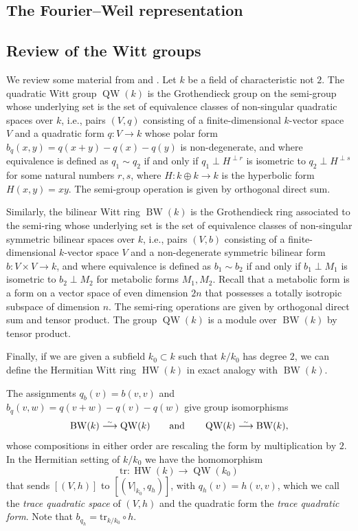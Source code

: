 \documentclass{article}
\def\tx#1{\textrm{#1}}
\def\simto{\buildrel\hbox{\tiny{$\sim$}}\over\longrightarrow}
\theoremstyle{definition}
\numberwithin{equation}{subsection}
\renewcommand{\-}{\hyp{}}
\DeclareMathOperator{\BW}{BW}
\DeclareMathOperator{\HW}{HW}
\DeclareMathOperator{\QW}{QW}
\begin{document}
\begin{appendices}
	 
	\section{The Fourier--Weil representation} \label{app:fw}

\subsection{Review of the Witt groups} \label{sub:Wittgroup}

We review some material from \cite{EKM2008} and \cite[Appendix 2]{MH73}. Let $k$ be a field of characteristic not $2$. The quadratic Witt group $\QW(k)$\index[notation]{QW@$\QW$} is the Grothendieck group on the semi-group whose underlying set is the set of equivalence classes of non-singular quadratic spaces over $k$, i.e., pairs $(V,q)$ consisting of a finite-dimensional $k$-vector space $V$ and a quadratic form $q : V \to k$ whose polar form $b_q(x,y)=q(x+y)-q(x)-q(y)$ is non-degenerate, and where equivalence is defined as $q_1 \sim q_2$ if and only if $q_1 \perp H^{\perp r}$ is isometric to $q_2 \perp H^{\perp s}$ for some natural numbers $r,s$, where $H : k \oplus k \to k$ is the hyperbolic form $H(x,y)=xy$. The semi-group operation is given by orthogonal direct sum.

Similarly, the bilinear Witt
ring $\BW(k)$\index[notation]{BW@$\BW$} is the Grothendieck ring associated to the semi-ring whose underlying set is the set of equivalence classes of non-singular symmetric bilinear spaces over $k$, i.e., pairs $(V,b)$ consisting of a finite-dimensional $k$-vector space $V$ and a non-degenerate symmetric bilinear form $b : V \times V \to k$, and where equivalence is defined as $b_1 \sim b_2$ if and only if $b_1 \perp M_1$ is isometric to $b_2 \perp M_2$ for metabolic forms $M_1,M_2$. Recall that a metabolic form is a form on a vector space of even dimension $2n$ that possesses a totally isotropic subspace of dimension $n$. The semi-ring operations are given by orthogonal direct sum and tensor product. The group $\QW(k)$ is a module over $\BW(k)$ by tensor product. 

Finally, if we are given a subfield $k_0 \subset k$ such that $k/k_0$ has degree $2$, we can define the Hermitian Witt
ring $\HW(k)$\index[notation]{HW@$\HW$} in exact analogy with $\BW(k)$. 

The assignments $q_b(v)=b(v,v)$ and $b_q(v,w)=q(v+w)-q(v)-q(w)$ give group isomorphisms
\[ \BW(k) \simto \QW(k)\qquad \tx{and} \qquad \QW(k) \simto \BW(k),\]
whose compositions in either order are rescaling the form by multiplication by $2$. In the Hermitian setting of $k/k_0$ we have the homomorphism
\[ \tx{tr} : \HW(k) \to \QW(k_0) \]
that sends $[(V,h)]$ to $[(V|_{k_0},q_h)]$, with $q_h(v)=h(v,v)$, which we call the \emph{trace quadratic space} of $(V,h)$ and the quadratic form the \emph{trace quadratic form}. Note that $b_{q_h}=\tx{tr}_{k/k_0}\circ h$.


\end{appendices}
\end{document}
